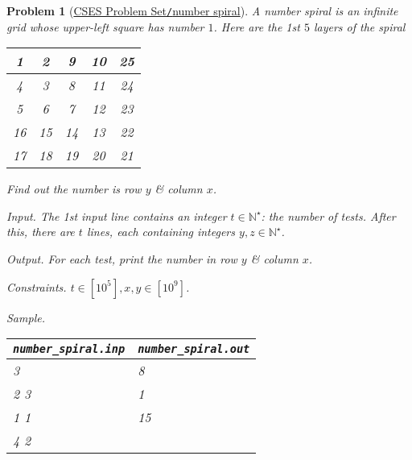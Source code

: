 \documentclass{article}
\newtheorem{problem}{Problem}
\begin{document}
\begin{problem}[\href{https://cses.fi/problemset/task/1071}{CSES Problem Set{\tt/}number spiral}]
    A {\rm number spiral} is an infinite grid whose upper-left square has number $1$. Here are the 1st $5$ layers of the spiral
    \begin{table}[H]
        \centering
        \begin{tabular}{|c|c|c|c|c|}
            \hline
            1 & 2 & 9 & 10 & 25 \\
            \hline
            4 & 3 & 8 & 11 & 24 \\
            \hline
            5 & 6 & 7 & 12 & 23 \\
            \hline
            16 & 15 & 14 & 13 & 22 \\
            \hline
            17 & 18 & 19 & 20 & 21 \\
            \hline
        \end{tabular}
    \end{table}
    Find out the number is row $y$ \& column $x$.
    \item {\sf Input.} The 1st input line contains an integer $t\in\mathbb{N}^\star$: the number of tests. After this, there are $t$ lines, each containing integers $y,z\in\mathbb{N}^\star$.
    \item {\sf Output.} For each test, print the number in row $y$ \& column $x$. 
    \item {\sf Constraints.} $t\in[10^5],x,y\in[10^9]$.
    \item {\sf Sample.}
    \begin{table}[H]
        \centering
        \begin{tabular}{|l|l|}
            \hline
            \verb|number_spiral.inp| & \verb|number_spiral.out| \\
            \hline
            3 & 8 \\
            2 3 & 1 \\
            1 1 & 15 \\
            4 2 & \\
            \hline
        \end{tabular}
    \end{table}
\end{problem}
\end{document}
